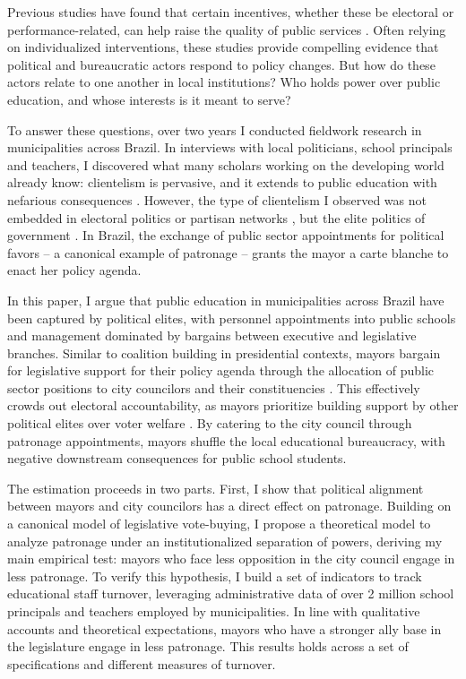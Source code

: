 \documentclass[12pt,a4paper]{article}
\begin{document}
Previous studies have found that certain incentives, whether these be electoral or performance-related, can help raise the quality of public services \citep{gulzar_politicians_2017,duflo_incentives_2012}. Often relying on individualized interventions, these studies provide compelling evidence that political and bureaucratic actors respond to policy changes.\citep{finan_personnel_2015} But how do these actors relate to one another in local institutions? Who holds power over public education, and whose interests is it meant to serve?

To answer these questions, over two years I conducted fieldwork research in municipalities across Brazil. In interviews with local politicians, school principals and teachers, I discovered what many scholars working on the developing world already know: clientelism is pervasive, and it extends to public education with nefarious consequences \citep{stokes_brokers_2013}. However, the type of clientelism I observed was not embedded in electoral politics \citep{oliveros_making_2016} or partisan networks \citep{akhtari_political_2015,colonnelli_patronage_2017}, but the elite politics of government \citep{raile_executive_2011}. In Brazil, the exchange of public sector appointments for political favors -- a canonical example of patronage -- grants the mayor a carte blanche to enact her policy agenda.

In this paper, I argue that public education in municipalities across Brazil have been captured by political elites, with personnel appointments into public schools and management dominated by bargains between executive and legislative branches. Similar to coalition building in presidential contexts, mayors bargain for legislative support for their policy agenda through the allocation of public sector positions to city councilors and their constituencies \citep{laver_coalitions_1990, power_optimism_2010}. This effectively crowds out electoral accountability, as mayors prioritize building support by other political elites over voter welfare \citep{ferejohn_incumbent_1986}. By catering to the city council through patronage appointments, mayors shuffle the local educational bureaucracy, with negative downstream consequences for public school students.

The estimation proceeds in two parts. First, I show that political alignment between mayors and city councilors has a direct effect on patronage. Building on a canonical model of legislative vote-buying, I propose a theoretical model to analyze patronage under an institutionalized separation of powers, deriving my main empirical test: mayors who face less opposition in the city council engage in less patronage. To verify this hypothesis, I build a set of indicators to track educational staff turnover, leveraging administrative data of over 2 million school principals and teachers employed by municipalities. In line with qualitative accounts and theoretical expectations, mayors who have a stronger ally base in the legislature engage in less patronage. This results holds across a set of specifications and different measures of turnover.
\end{document}
